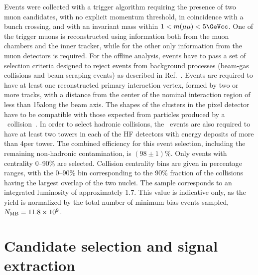 Events were collected with a trigger algorithm requiring the presence of two muon candidates, with no explicit momentum threshold, in coincidence with a bunch crossing, and with an invariant mass within $1<m(\mu\mu)<5 \GeVcc$. One of the trigger muons is reconstructed using information both from the muon chambers and the inner tracker, while for the other only information from the muon detectors is required.  
%
For the offline analysis, events have to pass a set of selection criteria designed to reject events from background processes (beam-gas collisions and beam scraping events) as described in Ref.~\cite{Khachatryan:2016odn}. Events are required to have at least one reconstructed primary interaction vertex, formed by two or more tracks, with a distance from the center of the nominal interaction region of less than 15\cm along the beam axis. The shapes of the clusters in the pixel detector have to be compatible with those expected from particles produced by a \PbPb\ collision~\cite{Khachatryan:2010xs}. In order to select hadronic collisions, the \PbPb\ events are also required to have at least two towers in each of the HF detectors with energy deposits of more than 4\GeV per tower. The combined efficiency for this event selection, including the remaining non-hadronic contamination, is $(98\pm1)\%$. 
Only events with centrality 0--90\% are selected. Collision centrality bins are given in percentage ranges,
with the 0--90\% bin corresponding to the 90\% fraction of the collisions having the largest overlap of the two nuclei. 
The \PbPb sample corresponds to an integrated luminosity of approximately 1.7\nbinv.
This value is indicative only, as the \PbPb yield is normalized by the total number of minimum bias events sampled, $N_{\text{MB}} = 11.8 \times 10^9$. 

\section{Candidate selection and signal extraction}
\label{sec:sel}

